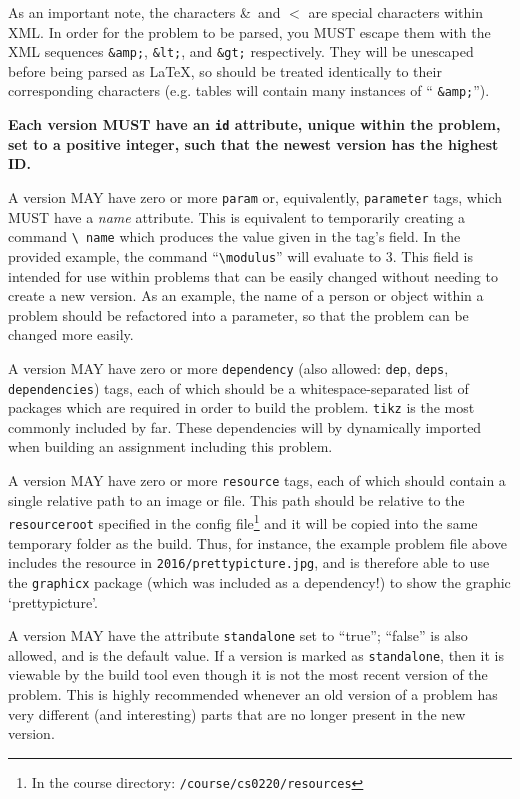     As an important note, the characters \&\ and $<$ are special 
    characters within XML. In order for the problem to be parsed, you MUST 
    escape them with the XML sequences \texttt{\&amp;}, \texttt{\&lt;}, 
    and \texttt{\&gt;} respectively. They will be unescaped before being 
    parsed as \LaTeX, so should be treated identically to their 
    corresponding characters (e.g. tables will contain many instances of ``
    \texttt{\&amp;}'').
    
    \textbf{Each version MUST have an \texttt{id} attribute, unique within 
    the problem, set to a positive integer, such that the newest version 
    has the highest ID.}
    
    A version MAY have zero or more \texttt{param} or, equivalently, 
    \texttt{parameter} tags, which MUST have a \textit{name} attribute. This is 
    equivalent to temporarily creating a command \texttt{\textbackslash 
    name} which produces the value given in the tag's field. In the 
    provided example, the command ``\texttt{\textbackslash modulus}'' will 
    evaluate to 3. This field is intended for use within problems that can 
    be easily changed without needing to create a new version. As an 
    example, the name of a person or object within a problem should be 
    refactored into a parameter, so that the problem can be changed more easily.
    
    A version MAY have zero or more \texttt{dependency} (also allowed: 
    \texttt{dep}, \texttt{deps}, \texttt{dependencies}) tags, each of 
    which should be a whitespace-separated list of packages which are 
    required in order to build the problem. \texttt{tikz} is the most 
    commonly included by far. These dependencies will by dynamically 
    imported when building an assignment including this problem.
    
    A version MAY have zero or more \texttt{resource} tags, each of which
    should contain a single relative path to an image or file. This path
    should be relative to the \texttt{resourceroot} specified in the config
    file\footnote{In the course directory: \texttt{/course/cs0220/resources}}
    and it will be copied into the same temporary folder as the build.
    Thus, for instance, the example problem file above includes the resource
    in \texttt{2016/prettypicture.jpg}, and is therefore able to use
    the \texttt{graphicx} package (which was included as a dependency!) to
    show the graphic `prettypicture'. 
    
    A version MAY have the attribute \texttt{standalone} set to ``true'';
    ``false'' is also allowed, and is the default value. If a version is
    marked as \texttt{standalone}, then it is viewable by the build tool
    even though it is not the most recent version of the problem. This is
    highly recommended whenever an old version of a problem has very different
    (and interesting) parts that are no longer present in the new version.
    
